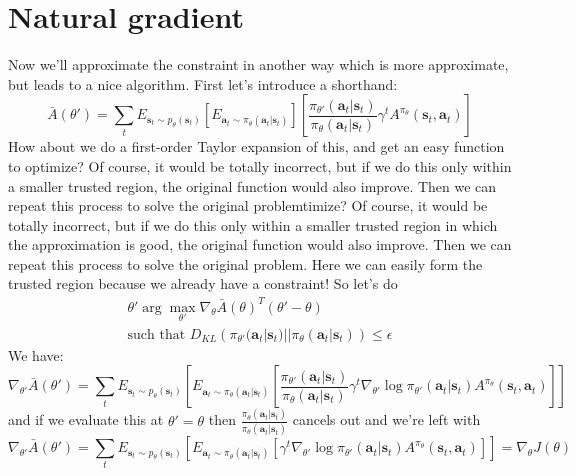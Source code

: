 \documentclass{report}
\newcommand{\argmax}{\arg\!\max}
\begin{document}
\section{Natural gradient}
Now we'll approximate the constraint in another way which is more approximate,
but leads to a nice algorithm.
First let's introduce a shorthand:
\begin{equation}
		\bar{A} (\theta') =
\sum_{t}^{} E_{ \bm{s}_{t}\sim p_{ \theta } (\bm{s}_{t}) }
		\left[ E_{ \bm{a}_{t}\sim \pi_{ \theta } (\bm{a}_{t}| \bm{s}_{t} ) } \right]
		\left[ \frac{\pi_{ \theta' }(\bm{a}_{t}| \bm{s}_{t} )}{\pi_{ \theta }(\bm{a}_{t}| \bm{s}_{t} )} 
		\gamma^{ t } A^{ \pi_{ \theta } } (\bm{s}_{t}, \bm{a}_{t} )\right]
\end{equation}
How about we do a first-order Taylor expansion of this,
and get an easy function to optimize?
Of course, it would be totally incorrect, but if we do this only within
a smaller trusted region, the original function would also improve.
Then we can repeat this process to solve the original problemtimize?
Of course, it would be totally incorrect, but if we do this only within
a smaller trusted region in which the approximation is good, the original function would also improve.
Then we can repeat this process to solve the original problem.
Here we can easily form the trusted region 
because we already have a constraint!
So let's do
\begin{gather}
		\theta' \argmax_{\theta'} \nabla_{ \theta } \bar{A} (\theta)^{ T } (\theta' - \theta) \\
		\text{such that } D_{ KL } \left( 
\pi_{ \theta' } (\bm{a}_{t}| \bm{s}_{t} ) ||
\pi_{ \theta } (\bm{a}_{t}| \bm{s}_{t} ) 
		\right) \leq \epsilon
\end{gather}
We have:
\begin{equation}
\nabla_{ \theta' } \bar{A} (\theta') = 
\sum_{t}^{} E_{ \bm{s}_{t}\sim p_{ \theta } (\bm{s}_{t})} \left[ 
E_{ \bm{a}_{t} \sim \pi_{ \theta }(\bm{a}_{t}| \bm{s}_{t} ) }
\left[ 
\frac{\pi_{ \theta' }(\bm{a}_{t}| \bm{s}_{t} )}{\pi_{ \theta }(\bm{a}_{t}| \bm{s}_{t} )}
\gamma^{ t } \nabla_{ \theta' } \log \pi_{ \theta' } (\bm{a}_{t}| \bm{s}_{t} )
A^{ \pi_{ \theta } } (\bm{s}_{t}, \bm{a}_{t} )
\right] 
\right] 
\end{equation}
and if we evaluate this at $ \theta' = \theta  $ then
$\frac{\pi_{ \theta }(\bm{a}_{t}| \bm{s}_{t} )}{\pi_{ \theta }(\bm{a}_{t}| \bm{s}_{t} )}$ cancels out
and we're left with
\begin{equation}
\nabla_{ \theta' } \bar{A} (\theta') = 
\sum_{t}^{} E_{ \bm{s}_{t}\sim p_{ \theta } (\bm{s}_{t})} \left[ 
E_{ \bm{a}_{t} \sim \pi_{ \theta }(\bm{a}_{t}| \bm{s}_{t} ) }
\left[ 
\gamma^{ t } \nabla_{ \theta' } \log \pi_{ \theta' } (\bm{a}_{t}| \bm{s}_{t} )
A^{ \pi_{ \theta } } (\bm{s}_{t}, \bm{a}_{t} )
\right] 
\right] = \nabla_{ \theta } J (\theta)
\end{equation}
\end{document}
